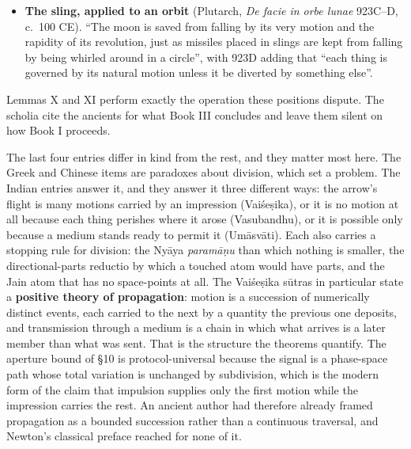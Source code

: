 \documentclass[11pt,a4paper]{article}
\newcommand{\tightlist}{\setlength{\itemsep}{0pt}\setlength{\parskip}{0pt}}
\begin{document}
\begin{itemize}
  \begin{enumerate}
  \def\labelenumi{\alph{enumi}.}
  \setcounter{enumi}{2}
  \tightlist
  \item
    25 BCE). The voice is propelled ``by an infinite number of circles
    similar to those generated in standing water when a stone is cast
    therein'', but ``whereas the circles in water only spread
    horizontally, the voice, on the contrary, extends vertically as well
    as horizontally'', so the water-ring image is corrected into a
    spherical wave by argument from the disanalogy.
  \end{enumerate}
\item
  \textbf{The sling, applied to an orbit} (Plutarch, \emph{De facie in
  orbe lunae} 923C--D, c.~100 CE). ``The moon is saved from falling by
  its very motion and the rapidity of its revolution, just as missiles
  placed in slings are kept from falling by being whirled around in a
  circle'', with 923D adding that ``each thing is governed by its
  natural motion unless it be diverted by something else''.
\end{itemize}

Lemmas X and XI perform exactly the operation these positions dispute.
The scholia cite the ancients for what Book III concludes and leave them
silent on how Book I proceeds.

The last four entries differ in kind from the rest, and they matter most
here. The Greek and Chinese items are paradoxes about division, which
set a problem. The Indian entries answer it, and they answer it three
different ways: the arrow's flight is many motions carried by an
impression (Vaiśeṣika), or it is no motion at all because each thing
perishes where it arose (Vasubandhu), or it is possible only because a
medium stands ready to permit it (Umāsvāti). Each also carries a
stopping rule for division: the Nyāya \emph{paramāṇu} than which nothing
is smaller, the directional-parts reductio by which a touched atom would
have parts, and the Jain atom that has no space-points at all. The
Vaiśeṣika sūtras in particular state a \textbf{positive theory of
propagation}: motion is a succession of numerically distinct events,
each carried to the next by a quantity the previous one deposits, and
transmission through a medium is a chain in which what arrives is a
later member than what was sent. That is the structure the theorems
quantify. The aperture bound of §10 is protocol-universal because the
signal is a phase-space path whose total variation is unchanged by
subdivision, which is the modern form of the claim that impulsion
supplies only the first motion while the impression carries the rest. An
ancient author had therefore already framed propagation as a bounded
succession rather than a continuous traversal, and Newton's classical
preface reached for none of it.
\end{document}
